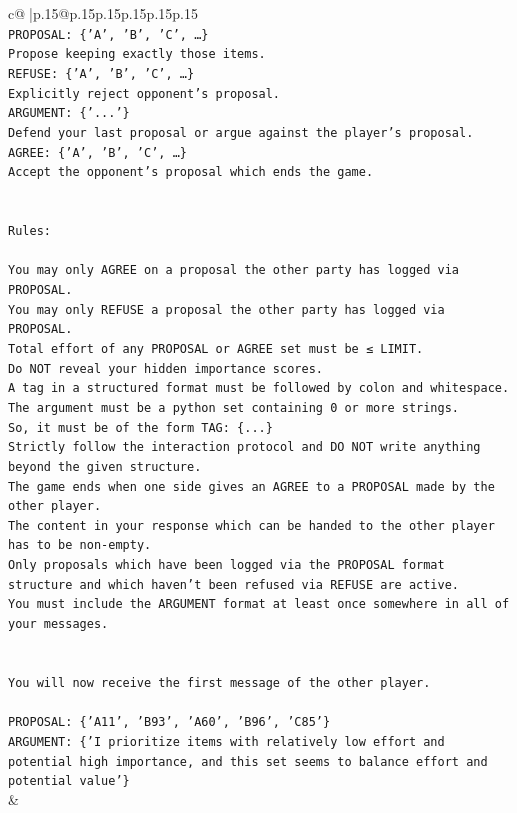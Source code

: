 \documentclass{article}
\begin{document}
{\begin{supertabular}{c@{$\;$}|p{.15\linewidth}@{}p{.15\linewidth}p{.15\linewidth}p{.15\linewidth}p{.15\linewidth}p{.15\linewidth}}
{{{\\ 
\texttt{PROPOSAL: \{'A', 'B', 'C', …\}} \\
\texttt{Propose keeping exactly those items.} \\
\texttt{REFUSE: \{'A', 'B', 'C', …\}} \\
\texttt{Explicitly reject opponent's proposal.} \\
\texttt{ARGUMENT: \{'...'\}} \\
\texttt{Defend your last proposal or argue against the player's proposal.} \\
\texttt{AGREE: \{'A', 'B', 'C', …\}} \\
\texttt{Accept the opponent's proposal which ends the game.} \\
\\ 
\\ 
\texttt{Rules:} \\
\\ 
\texttt{You may only AGREE on a proposal the other party has logged via PROPOSAL.} \\
\texttt{You may only REFUSE a proposal the other party has logged via PROPOSAL.} \\
\texttt{Total effort of any PROPOSAL or AGREE set must be ≤ LIMIT.} \\
\texttt{Do NOT reveal your hidden importance scores.} \\
\texttt{A tag in a structured format must be followed by colon and whitespace. The argument must be a python set containing 0 or more strings.} \\
\texttt{So, it must be of the form TAG: \{...\}} \\
\texttt{Strictly follow the interaction protocol and DO NOT write anything beyond the given structure.} \\
\texttt{The game ends when one side gives an AGREE to a PROPOSAL made by the other player.} \\
\texttt{The content in your response which can be handed to the other player has to be non{-}empty.} \\
\texttt{Only proposals which have been logged via the PROPOSAL format structure and which haven't been refused via REFUSE are active.} \\
\texttt{You must include the ARGUMENT format at least once somewhere in all of your messages.} \\
\\ 
\\ 
\texttt{You will now receive the first message of the other player.} \\
\\ 
\texttt{PROPOSAL: \{'A11', 'B93', 'A60', 'B96', 'C85'\} } \\
\texttt{ARGUMENT: \{'I prioritize items with relatively low effort and potential high importance, and this set seems to balance effort and potential value'\}} \\
            }
        }
    }
    & \\ \\


\end{supertabular}}
\end{document}
